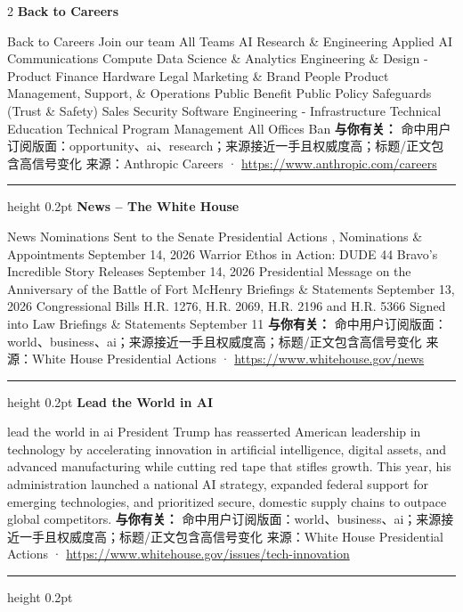 \documentclass[10.5pt]{ctexart}
\begin{document}
\begin{multicols}{2}
{\large\bfseries Back to Careers}\par
Back to Careers Join our team All Teams AI Research \& Engineering Applied AI Communications Compute Data Science \& Analytics Engineering \& Design - Product Finance Hardware Legal Marketing \& Brand People Product Management, Support, \& Operations Public Benefit Public Policy Safeguards (Trust \& Safety) Sales Security Software Engineering - Infrastructure Technical Education Technical Program Management All Offices Ban
\textbf{与你有关：} 命中用户订阅版面：opportunity、ai、research；来源接近一手且权威度高；标题/正文包含高信号变化
{\footnotesize\color{ormuted} 来源：Anthropic Careers · \url{https://www.anthropic.com/careers}}
\vspace{2mm}
\hrule height 0.2pt
\vspace{2mm}
{\large\bfseries News – The White House}\par
News Nominations Sent to the Senate Presidential Actions , Nominations \& Appointments September 14, 2026 Warrior Ethos in Action: DUDE 44 Bravo’s Incredible Story Releases September 14, 2026 Presidential Message on the Anniversary of the Battle of Fort McHenry Briefings \& Statements September 13, 2026 Congressional Bills H.R. 1276, H.R. 2069, H.R. 2196 and H.R. 5366 Signed into Law Briefings \& Statements September 11
\textbf{与你有关：} 命中用户订阅版面：world、business、ai；来源接近一手且权威度高；标题/正文包含高信号变化
{\footnotesize\color{ormuted} 来源：White House Presidential Actions · \url{https://www.whitehouse.gov/news}}
\vspace{2mm}
\hrule height 0.2pt
\vspace{2mm}
{\large\bfseries Lead the World in AI}\par
lead the world in ai President Trump has reasserted American leadership in technology by accelerating innovation in artificial intelligence, digital assets, and advanced manufacturing while cutting red tape that stifles growth. This year, his administration launched a national AI strategy, expanded federal support for emerging technologies, and prioritized secure, domestic supply chains to outpace global competitors.
\textbf{与你有关：} 命中用户订阅版面：world、business、ai；来源接近一手且权威度高；标题/正文包含高信号变化
{\footnotesize\color{ormuted} 来源：White House Presidential Actions · \url{https://www.whitehouse.gov/issues/tech-innovation}}
\vspace{2mm}
\hrule height 0.2pt
\vspace{2mm}

\end{multicols}
\end{document}
